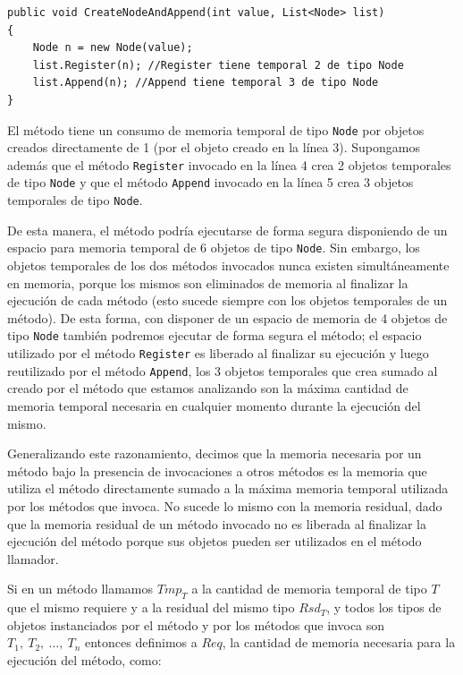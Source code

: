 \documentclass[12pt,a4paper]{article}
\newcommand\mono[1]{\texttt{#1}}
\begin{document}
			\vspace{15pt}
			\begin{lstlisting}[caption=Ejemplo de consumo de memoria temporal bajo invocaciones]
public void CreateNodeAndAppend(int value, List<Node> list)
{
	Node n = new Node(value);
	list.Register(n); //Register tiene temporal 2 de tipo Node
	list.Append(n); //Append tiene temporal 3 de tipo Node
}
			\end{lstlisting}

			El método tiene un consumo de memoria temporal de tipo \mono{Node} por objetos creados directamente de 1 (por el objeto creado en la línea 3). Supongamos además que el método \mono{Register} invocado en la línea 4 crea 2 objetos temporales de tipo \mono{Node} y que el método \mono{Append} invocado en la línea 5 crea 3 objetos temporales de tipo \mono{Node}.

			De esta manera, el método podría ejecutarse de forma segura disponiendo de un espacio para memoria temporal de 6 objetos de tipo \mono{Node}. Sin embargo, los objetos temporales de los dos métodos invocados nunca existen simultáneamente en memoria, porque los mismos son eliminados de memoria al finalizar la ejecución de cada método (esto sucede siempre con los objetos temporales de un método). De esta forma, con disponer de un espacio de memoria de 4 objetos de tipo \mono{Node} también podremos ejecutar de forma segura el método; el espacio utilizado por el método \mono{Register} es liberado al finalizar su ejecución y luego reutilizado por el método \mono{Append}, los 3 objetos temporales que crea sumado al creado por el método que estamos analizando son la máxima cantidad de memoria temporal necesaria en cualquier momento durante la ejecución del mismo.

			Generalizando este razonamiento, decimos que la memoria necesaria por un método bajo la presencia de invocaciones a otros métodos es la memoria que utiliza el método directamente sumado a la máxima memoria temporal utilizada por los métodos que invoca. No sucede lo mismo con la memoria residual, dado que la memoria residual de un método invocado no es liberada al finalizar la ejecución del método porque sus objetos pueden ser utilizados en el método llamador.

			Si en un método llamamos $Tmp_T$ a la cantidad de memoria temporal de tipo $T$ que el mismo requiere y a la residual del mismo tipo $Rsd_T$, y todos los tipos de objetos instanciados por el método y por los métodos que invoca son $T_1,\ T_2,\ \dots,\ T_n$ entonces definimos a $Req$, la cantidad de memoria necesaria para la ejecución del método, como:
\end{document}
